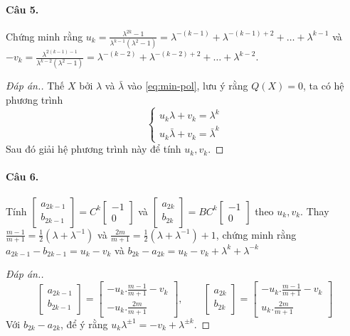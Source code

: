\documentclass[11pt]{article}
\begin{document}
\paragraph{Câu 5.}
\label{sec:orgbe50be4}
Chứng minh rằng \(u_k = \frac{\lambda^{2k} - 1}{\lambda^{k-1}(\lambda^2-1)} =
\lambda^{-(k-1)} + \lambda^{-(k-1) + 2} + \dots + \lambda^{k-1}\) và \(-v_k
=  \frac{\lambda^{2(k-1) - 1}}{\lambda^{k-2} (\lambda^2-1)} = \lambda^{-(k-2)} +
\lambda^{-(k-2) + 2} + \dots + \lambda^{k-2}\).
\begin{proof}[Đáp án.]
Thế \(X\) bởi \(\lambda\) và \(\bar \lambda\) vào
\eqref{eq:min-pol}, lưu ý rằng \(Q(X)=0\), ta có hệ phương trình
\begin{equation*}
 \begin{cases}
u_k\lambda + v_k = \lambda^k   \\
u_k\bar \lambda + v_k = \bar\lambda^k 
 \end{cases}
\end{equation*}
Sau đó giải hệ phương trình này để tính \(u_k, v_k\).
\end{proof}


\paragraph{Câu 6.}
\label{sec:org0f2208f}
Tính \(\begin{bmatrix} a_{2k-1}\\b_{2k-1} \end{bmatrix} = C^k \begin{bmatrix} -1\\0
\end{bmatrix}\) và \(\begin{bmatrix} a_{2k}\\b_{2k} \end{bmatrix} = BC^k \begin{bmatrix} -1\\0
\end{bmatrix}\) theo \(u_k, v_k\). Thay \(\frac{m-1}{m+1} = \frac{1}{2}(\lambda + \lambda^{-1})\)
và \(\frac{2m}{m+1} = \frac{1}{2}(\lambda + \lambda^{-1}) + 1\), chứng minh rằng \(a_{2k-1} - b_{2k-1} = u_k - v_k\) và \(b_{2k} - a_{2k} = u_k - v_k +\lambda^k + \lambda^{-k}\)
\begin{proof}[Đáp án.]
\begin{equation*}
 \begin{bmatrix} a_{2k-1}\\b_{2k-1} \end{bmatrix}   = \begin{bmatrix} -u_k.\frac{m-1}{m+1} -
v_k\\-u_k.\frac{2m}{m+1} \end{bmatrix}, \qquad \begin{bmatrix} a_{2k}\\b_{2k} \end{bmatrix}=  \begin{bmatrix} -u_k.\frac{m-1}{m+1} -
v_k\\u_k.\frac{2m}{m+1} \end{bmatrix}
\end{equation*}
Với \(b_{2k} - a_{2k}\), để ý rằng \(u_k\lambda^{\pm 1} = -v_k + \lambda^{\pm k}\).
\end{proof}
\end{document}
